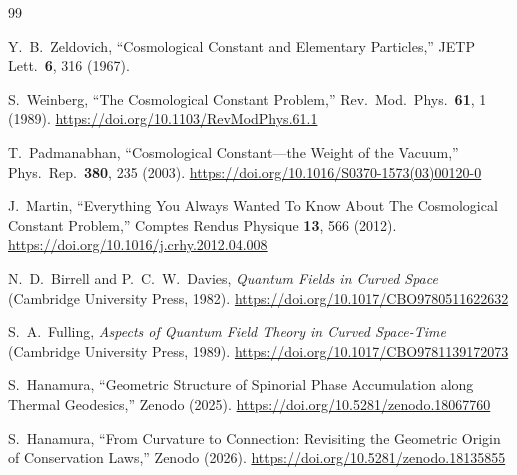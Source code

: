 \documentclass[%
 reprint,
 amsmath,amssymb,
 aps,
 prb,
]{revtex4-2}
\numberwithin{equation}{section}
\begin{document}
\begin{thebibliography}{99}

Y.~B.~Zeldovich,
``Cosmological Constant and Elementary Particles,''
JETP Lett.\ \textbf{6}, 316 (1967).

S.~Weinberg,
``The Cosmological Constant Problem,''
Rev.\ Mod.\ Phys.\ \textbf{61}, 1 (1989).
\href{https://doi.org/10.1103/RevModPhys.61.1}{https://doi.org/10.1103/RevModPhys.61.1}

T.~Padmanabhan,
``Cosmological Constant---the Weight of the Vacuum,''
Phys.\ Rep.\ \textbf{380}, 235 (2003).
\href{https://doi.org/10.1016/S0370-1573(03)00120-0}{https://doi.org/10.1016/S0370-1573(03)00120-0}

J.~Martin,
``Everything You Always Wanted To Know About The Cosmological Constant Problem,''
Comptes Rendus Physique \textbf{13}, 566 (2012).
\href{https://doi.org/10.1016/j.crhy.2012.04.008}{https://doi.org/10.1016/j.crhy.2012.04.008}

N.~D.~Birrell and P.~C.~W.~Davies,
\textit{Quantum Fields in Curved Space}
(Cambridge University Press, 1982).
\href{https://doi.org/10.1017/CBO9780511622632}{https://doi.org/10.1017/CBO9780511622632}

S.~A.~Fulling,
\textit{Aspects of Quantum Field Theory in Curved Space-Time}
(Cambridge University Press, 1989).
\href{https://doi.org/10.1017/CBO9781139172073}{https://doi.org/10.1017/CBO9781139172073}


S.~Hanamura, ``Geometric Structure of Spinorial Phase Accumulation along Thermal Geodesics,'' Zenodo (2025). \href{https://doi.org/10.5281/zenodo.18067760}{https://doi.org/10.5281/zenodo.18067760}

S.~Hanamura, ``From Curvature to Connection: Revisiting the Geometric Origin of Conservation Laws,'' Zenodo (2026). \href{https://doi.org/10.5281/zenodo.18135855}{https://doi.org/10.5281/zenodo.18135855}


\end{thebibliography}
\end{document}
